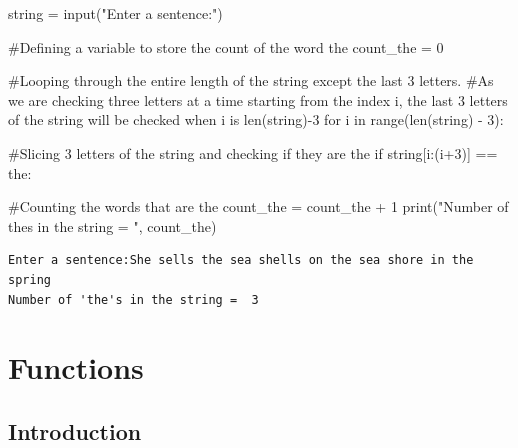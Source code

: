 \documentclass[
  letterpaper,
  DIV=11,
  numbers=noendperiod]{scrreprt}
\newenvironment{Shaded}{\begin{snugshade}}{\end{snugshade}}
\newcommand{\BuiltInTok}[1]{\textcolor[rgb]{0.00,0.23,0.31}{#1}}
\newcommand{\CommentTok}[1]{\textcolor[rgb]{0.37,0.37,0.37}{#1}}
\newcommand{\ControlFlowTok}[1]{\textcolor[rgb]{0.00,0.23,0.31}{#1}}
\newcommand{\DecValTok}[1]{\textcolor[rgb]{0.68,0.00,0.00}{#1}}
\newcommand{\KeywordTok}[1]{\textcolor[rgb]{0.00,0.23,0.31}{#1}}
\newcommand{\NormalTok}[1]{\textcolor[rgb]{0.00,0.23,0.31}{#1}}
\newcommand{\OperatorTok}[1]{\textcolor[rgb]{0.37,0.37,0.37}{#1}}
\newcommand{\StringTok}[1]{\textcolor[rgb]{0.13,0.47,0.30}{#1}}
\begin{document}
\begin{Shaded}
\begin{Highlighting}[]
\NormalTok{string }\OperatorTok{=} \BuiltInTok{input}\NormalTok{(}\StringTok{"Enter a sentence:"}\NormalTok{)}

\CommentTok{\#Defining a variable to store the count of the word \textquotesingle{}the\textquotesingle{}}
\NormalTok{count\_the }\OperatorTok{=} \DecValTok{0}

\CommentTok{\#Looping through the entire length of the string except the last 3 letters.}
\CommentTok{\#As we are checking three letters at a time starting from the index \textquotesingle{}i\textquotesingle{}, the last 3 letters of the string will be checked when \textquotesingle{}i\textquotesingle{} is len(string){-}3}
\ControlFlowTok{for}\NormalTok{ i }\KeywordTok{in} \BuiltInTok{range}\NormalTok{(}\BuiltInTok{len}\NormalTok{(string) }\OperatorTok{{-}} \DecValTok{3}\NormalTok{):}
    
    \CommentTok{\#Slicing 3 letters of the string and checking if they are \textquotesingle{}the\textquotesingle{}}
    \ControlFlowTok{if}\NormalTok{ string[i:(i}\OperatorTok{+}\DecValTok{3}\NormalTok{)] }\OperatorTok{==} \StringTok{\textquotesingle{}the\textquotesingle{}}\NormalTok{:}
        
        \CommentTok{\#Counting the words that are \textquotesingle{}the\textquotesingle{}}
\NormalTok{        count\_the }\OperatorTok{=}\NormalTok{ count\_the }\OperatorTok{+} \DecValTok{1}
\BuiltInTok{print}\NormalTok{(}\StringTok{"Number of \textquotesingle{}the\textquotesingle{}s in the string = "}\NormalTok{, count\_the)}
\end{Highlighting}
\end{Shaded}

\begin{verbatim}
Enter a sentence:She sells the sea shells on the sea shore in the spring
Number of 'the's in the string =  3
\end{verbatim}

\hypertarget{functions}{%
\chapter{Functions}\label{functions}}

\hypertarget{introduction-1}{%
\section{Introduction}\label{introduction-1}}
\end{document}
